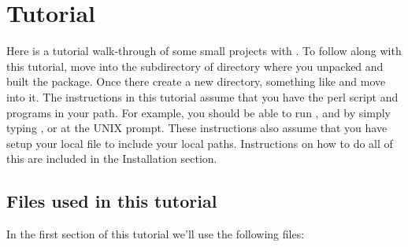 \section{Tutorial}
\label{section:tutorial}

Here is a tutorial walk-through of some small projects with
. To follow along with this tutorial, move into the
 subdirectory of  directory
where you unpacked and built the  package. Once there
create a new directory, something like  and move
into it. The instructions in this tutorial assume that you have the
 perl script and  programs in your path. For
example, you should be able to run ,
 and  by simply typing
,  or  at the
UNIX prompt.  These instructions also assume that you have setup your
local  file to include your local
paths. Instructions on how to do all of this are included in the
Installation section.

\subsection{Files used in this tutorial}

In the first section of this tutorial we'll use the following files:

